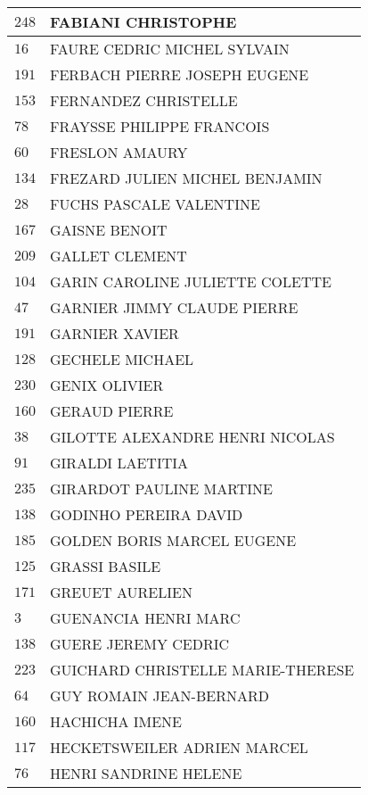 \begin{xltabular}{\linewidth}{|l|X|}
    \hline
    $248$ & FABIANI CHRISTOPHE \\
    \hline
    $16$ & FAURE CEDRIC MICHEL SYLVAIN \\
    \hline
    $191$ & FERBACH PIERRE JOSEPH EUGENE \\
    \hline
    $153$ & FERNANDEZ CHRISTELLE \\
    \hline
    $78$ & FRAYSSE PHILIPPE FRANCOIS \\
    \hline
    $60$ & FRESLON AMAURY \\
    \hline
    $134$ & FREZARD JULIEN MICHEL BENJAMIN \\
    \hline
    $28$ & FUCHS PASCALE VALENTINE \\
    \hline
    $167$ & GAISNE BENOIT \\
    \hline
    $209$ & GALLET CLEMENT \\
    \hline
    $104$ & GARIN CAROLINE JULIETTE COLETTE \\
    \hline
    $47$ & GARNIER JIMMY CLAUDE PIERRE \\
    \hline
    $191$ & GARNIER XAVIER \\
    \hline
    $128$ & GECHELE MICHAEL \\
    \hline
    $230$ & GENIX OLIVIER \\
    \hline
    $160$ & GERAUD PIERRE \\
    \hline
    $38$ & GILOTTE ALEXANDRE HENRI NICOLAS \\
    \hline
    $91$ & GIRALDI LAETITIA \\
    \hline
    $235$ & GIRARDOT PAULINE MARTINE \\
    \hline
    $138$ & GODINHO PEREIRA DAVID \\
    \hline
    $185$ & GOLDEN BORIS MARCEL EUGENE \\
    \hline
    $125$ & GRASSI BASILE \\
    \hline
    $171$ & GREUET AURELIEN \\
    \hline
    $3$ & GUENANCIA HENRI MARC \\
    \hline
    $138$ & GUERE JEREMY CEDRIC \\
    \hline
    $223$ & GUICHARD CHRISTELLE MARIE-THERESE \\
    \hline
    $64$ & GUY ROMAIN JEAN-BERNARD \\
    \hline
    $160$ & HACHICHA IMENE \\
    \hline
    $117$ & HECKETSWEILER ADRIEN MARCEL \\
    \hline
    $76$ & HENRI SANDRINE HELENE \\

\end{xltabular}
